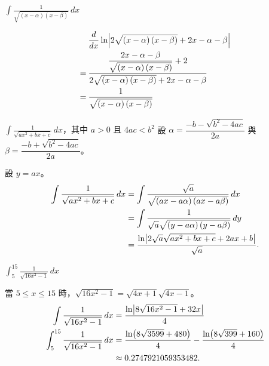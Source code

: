 \documentclass{beamer}
\newcommand{\Left} {\mathopen{}\mathclose\bgroup\left}
\newcommand{\Right}{\aftergroup\egroup\right}
\theoremstyle{remark}
\begin{document}
\begin{CJK}{UTF8}{bsmi}
\begin{frame}{$\displaystyle \int \frac{1}{\sqrt{(x - \alpha) \left( x - \beta \right)}}\,dx$}
  \begin{solution}
    \begin{align*}
	 & \frac{d}{dx} \ln \Left| 2 \sqrt{(x - \alpha) \left( x - \beta \right)} + 2x - \alpha - \beta \Right|\\
      =\:& \frac{\dfrac{2x - \alpha - \beta}{\sqrt{(x - \alpha) \left( x - \beta \right)}} + 2}
	   {2 \sqrt{(x - \alpha) \left( x - \beta \right)} + 2x - \alpha - \beta}\\
      =\:& \frac{1}{\sqrt{(x - \alpha) \left( x - \beta \right)}}
    \end{align*}
  \end{solution}
\end{frame}

\begin{frame}{$\displaystyle \int \frac{1}{\sqrt{ax^2 + bx + c}}\,dx$，其中 $a > 0$ 且 $4ac < b^2$}
  設 $\alpha = \dfrac{-b - \sqrt{b^2 - 4ac}}{2a}$ 與 $\beta = \dfrac{-b + \sqrt{b^2 - 4ac}}{2a}$。
  \begin{solution}
  設 $y = ax$。
    \begin{align*}
      \int \frac{1}{\sqrt{ax^2 + bx + c}}\,dx &= \int \frac{\sqrt a}{\sqrt{(ax - a\alpha) \left( ax - a\beta \right)}}\,dx\\
	&= \int \frac{1}{\sqrt a \sqrt{(y - a\alpha) \left( y - a\beta \right)}}\,dy\\
	&= \frac{\ln \Left| 2 \sqrt a \sqrt{ax^2 + bx + c} + 2ax + b \Right|}{\sqrt a}.
    \end{align*}
  \end{solution}
\end{frame}

\begin{frame}{$\displaystyle \int_5^{15} \frac{1}{\sqrt{16x^2 - 1}}\,dx$}
  \begin{solution}
    當 $5 \le x \le 15$ 時，$\sqrt{16x^2 - 1} = \sqrt{4x + 1} \sqrt{4x - 1}$。
    \begin{align*}
      \int \frac{1}{\sqrt{16x^2 - 1}}\,dx &= \frac{\ln \Left| 8\sqrt{16x^2 - 1} + 32x \Right|}{4}\\
      \int_5^{15} \frac{1}{\sqrt{16x^2 - 1}}\,dx &= \frac{\ln \Left( 8\sqrt{3599} + 480 \Right)}{4}
	  - \frac{\ln \Left( 8\sqrt{399} + 160 \Right)}{4}\\
	&\approx 0.2747921059353482.
    \end{align*}
  \end{solution}
\end{frame}


\end{CJK}
\end{document}
